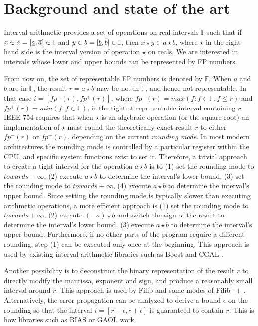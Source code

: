 
\section{Background and state of the art}
\label{sec:related}

Interval arithmetic \cite{hickey2001} provides a set of operations on real intervals $\mathbb{I}$ such that if $x\in a=[\underline{a},\overline{a}] \in \mathbb{I}$ and $y\in b=[\underline{b},\overline{b}] \in \mathbb{I}$,
then $x \star y  \in a \star b$, where $\star$ in the right-hand side is the interval version of operation $\star$ on reals.
We are interested in intervals whose lower and upper bounds can be represented by FP numbers.

From now on, the set of representable FP numbers is denoted by $\mathbb{F}$. When $a$ and $b$ are in $\mathbb{F}$, the result $r = a \star b$ may be not in $\mathbb{F}$, and hence not representable. In that case $i=[fp^{-}(r),fp^{+}(r)]$, where $fp^{-}(r) = max(f : f \in \mathbb{F}, f \leq r)$ and $fp^{+}(r) = min(f : f \in \mathbb{F})$, is the tightest representable interval containing $r$.
IEEE 754 requires that when $\star$ is an algebraic operation (or the square root) an implementation of $\star$ must round the theoretically exact result $r$ to either $fp^{-}(r)$ or $fp^{+}(r)$, depending on the current \emph{rounding mode}.
In most modern architectures the rounding mode is controlled by a particular register within the CPU, and specific system functions exist to set it. Therefore, a trivial approach to create a tight interval for the operation $a \star b$ is to (1) set the rounding mode to $towards -\infty$, (2) execute $a \star b$ to determine the interval's lower bound, (3) set the rounding mode to $towards +\infty$, (4) execute $a \star b$ to determine the interval's upper bound.
Since setting the rounding mode is typically slower than executing arithmetic operations, a more efficient approach is (1) set the rounding mode to $towards +\infty$, (2) execute $(-a) \star b$ and switch the sign of the result to determine the interval's lower bound, (3) execute $a \star b$ to determine the interval's upper bound. Furthermore, if no other parts of the program require a different rounding, step (1) can be executed only once at the beginning.
This approach is used by existing interval arithmetic libraries such as Boost \cite{bronnimann2006} and CGAL \cite{cgal}.

Another possibility is to deconstruct the binary representation of the result $r$ to directly modify the mantissa, exponent and sign, and produce a reasonably small interval around $r$. This approach is used by Filib and some modes of Filib++ \cite{filib, filibpp}.
Alternatively, the error propagation can be analyzed to derive a bound $\epsilon$ on the rounding so that the interval $i=[r-\epsilon,r+\epsilon]$ is guaranteed to contain $r$. This is how libraries such as BIAS \cite{bias} or GAOL \cite{gaol} work.

